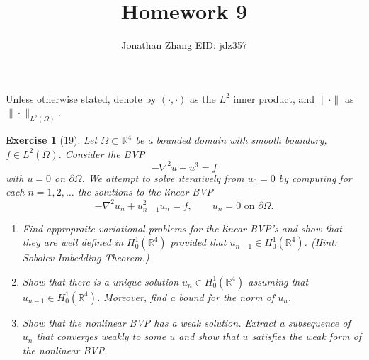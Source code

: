 \documentclass[letterpaper,twoside,11pt]{article}
\theoremstyle{mystyle}
\newtheorem*{exercise}{Exercise}
\newcommand{\R}{{\mathbb R}}
\begin{document}
\title{\vspace{-2\baselineskip} 
Homework 9
}
\author{Jonathan Zhang \qquad EID: { jdz357} }
\date{}
\maketitle


Unless otherwise stated, denote by $\left( \cdot, \cdot \right)$ as the $L^2$ inner product, and $\|\cdot\|$ as $\|\cdot \|_{L^2\left( \Omega \right)}$. 

\begin{exercise}[19]
	Let $\Omega \subset \R^4$ be a bounded domain with smooth boundary, $f \in L^2 (\Omega)$. Consider the BVP 
	\[-\nabla^2 u + u^3 = f\]
	with $u = 0$ on $\partial \Omega$.
  We attempt to solve iteratively from $u_0 = 0$ by computing for each $n = 1, 2,\dots$ the solutions to the linear BVP 
  \[-\nabla^2 u_n + u_{n-1}^2 u_n = f,\qquad u_n = 0 \text{ on }\partial \Omega.\]
  \begin{enumerate}
    \item Find appropraite variational problems for the linear BVP's and show that they are well defined in $H_0^1 \left( \R^4 \right)$ provided that $u_{n-1} \in H_0^1 \left( \R^4 \right)$. (Hint: Sobolev Imbedding Theorem.)
    \item Show that there is a unique solution $u_n \in H_0^1 \left( \R^4 \right)$ assuming that $u_{n-1} \in H_0^1 (\R^4)$. Moreover, find a bound for the norm of $u_n$. 
    \item Show that the nonlinear BVP has a weak solution. Extract a subsequence of $u_n$ that converges weakly to some $u$ and show that $u$ satisfies the weak form of the nonlinear BVP. 
  \end{enumerate}
\end{exercise}
\end{document}
